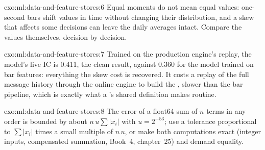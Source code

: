\begin{solution}{exo:ml:data-and-feature-stores:6}
Equal moments do not mean equal values: one-second bars shift values in time without changing their distribution, and a skew
that affects some decisions can leave the daily averages intact. Compare the values themselves, decision by decision.
\end{solution}

\begin{solution}{exo:ml:data-and-feature-stores:7}
Trained on the production engine's replay, the model's live IC is 0.411, the clean result, against 0.360 for the model trained on
bar features: everything the skew cost is recovered. It costs a replay of the full message history through the online engine to
build the , slower than the bar pipeline, which is exactly what a 's shared definition makes routine.
\end{solution}

\begin{solution}{exo:ml:data-and-feature-stores:8}
The error of a float64 sum of $n$ terms in any order is bounded by about $n\,u\sum|x_i|$ with $u = 2^{-53}$; use a tolerance
proportional to $\sum|x_i|$ times a small multiple of $n\,u$, or make both computations exact (integer inputs, compensated
summation, Book~4, chapter~25) and demand equality.
\end{solution}

